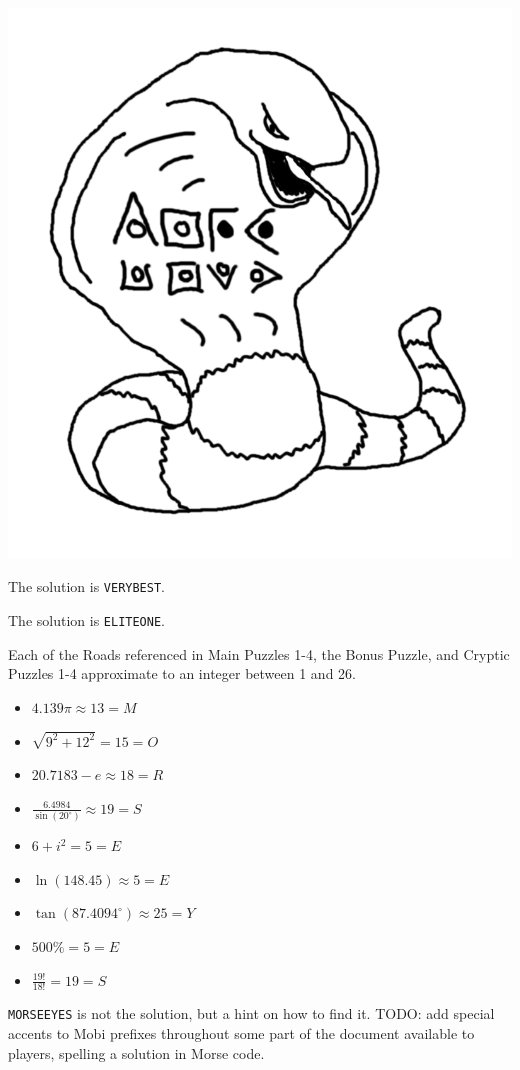 \begin{center}
\includegraphics[width=0.3\linewidth]{assets/not-arbok-solution.png}
\end{center}

The solution is \texttt{VERYBEST}.




The solution is \texttt{ELITEONE}.


Each of the Roads referenced in Main Puzzles 1-4, the Bonus Puzzle,
and Cryptic Puzzles 1-4 approximate to an integer between 1 and 26.

\begin{multicols}{3}
\begin{itemize}
  \item \(4.139\pi\approx13=M\)
  \item \(\sqrt{9^2+12^2}=15=O\)
  \item \(20.7183-e\approx18=R\)
  \item \(\frac{6.4984}{\sin(20^\circ)}\approx19=S\)
  \item \(6+i^2=5=E\)
  \item \(\ln(148.45)\approx5=E\)
  \item \(\tan(87.4094^\circ)\approx25=Y\)
  \item \(500\%=5=E\)
  \item \(\frac{19!}{18!}=19=S\)
\end{itemize}
\end{multicols}

\texttt{MORSEEYES} is not the solution, but a hint on how to find it.
TODO: add special accents to Mobi prefixes throughout some part of the
document available to players, spelling a solution in Morse code.

